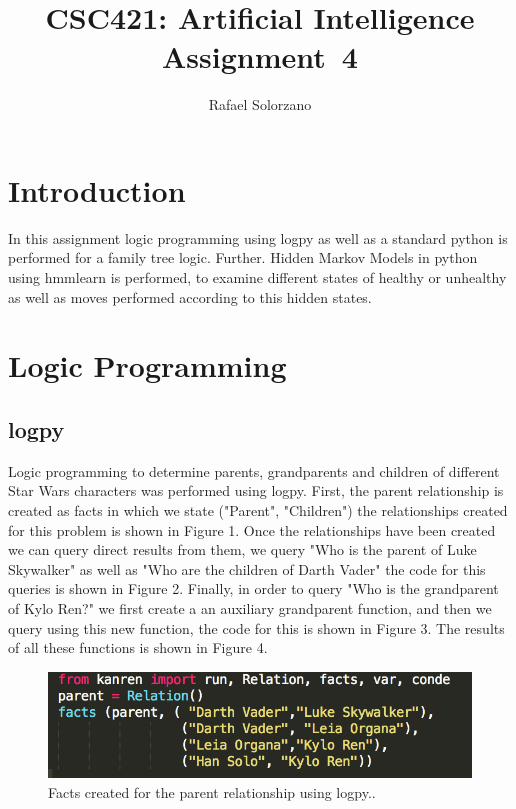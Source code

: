 \documentclass[12pt, letter]{article}
\newcommand{\courseName}{CSC421: Artificial Intelligence}
\newcommand{\assignName}{Assignment~4}
\begin{document}
\pagestyle{titlesec_assignment}

\title{\courseName\\\assignName}
\author{Rafael Solorzano}
\maketitle

\section{Introduction}

In this assignment logic programming using logpy as well as a standard python is performed for a family tree logic. Further. Hidden Markov Models in python using hmmlearn is performed, to examine different states of healthy or unhealthy as well as moves performed according to this hidden states. 

\section{Logic Programming}

\subsection{logpy}

Logic programming to determine parents, grandparents and children of different Star Wars characters was performed using logpy. First, the parent relationship is created as facts in which we state ("Parent", "Children") the relationships created for this problem is shown in Figure 1. Once the relationships have been created we can query direct results from them, we query "Who is the parent of Luke Skywalker" as well as "Who are the children of Darth Vader" the code for this queries is shown in Figure 2. Finally, in order to query "Who is the grandparent of Kylo Ren?" we first create a an auxiliary grandparent function, and then we query using this new function, the code for this is shown in Figure 3. The results of all these functions is shown in Figure 4.

 \begin{figure}[htb]
  \centering
  \includegraphics[width=0.75 \textwidth]{./figures/facts_logpy.png}
  \caption{Facts created for the parent relationship using logpy..}
\end{figure}
\end{document}
